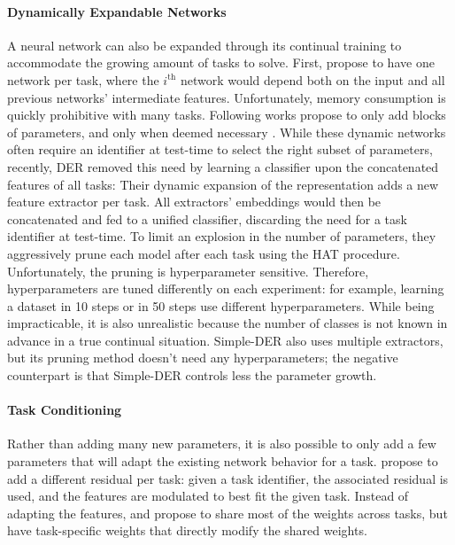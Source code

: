 \paragraph{Dynamically Expandable Networks} A neural network can also be expanded through its continual
training to accommodate the growing amount of tasks to solve. First, \citet{rusu2016progressive}
propose to have one network per task, where the $i^{\text{th}}$ network would depend both on the
input and all previous networks' intermediate features. Unfortunately, memory consumption is
quickly prohibitive with many tasks. Following works propose to only add blocks of parameters,
and only when deemed necessary \citep{veniat2021mntdp}. While these dynamic networks often require
an identifier at test-time to select the right subset of parameters, recently, DER
\citep{yan2021der} removed this need by learning a classifier upon the concatenated features of all tasks:
Their dynamic expansion of the representation adds a new feature extractor per task. All
extractors' embeddings would then be concatenated and fed to a unified classifier, discarding the
need for a task identifier at test-time. To limit an explosion in the number of parameters, they
aggressively prune each model after each task using the HAT \citep{serra2018hat} procedure.
Unfortunately, the pruning is hyperparameter sensitive. Therefore, hyperparameters are tuned
differently on each experiment: for example, learning a dataset in 10 steps or in 50 steps use
different hyperparameters. While being impracticable, it is also unrealistic because the number of
classes is not known in advance in a true continual situation. Simple-DER \citep{li2021preserve}
also uses multiple extractors, but its pruning method doesn't need any hyperparameters; the negative
counterpart is that Simple-DER controls less the parameter growth.

\paragraph{Task Conditioning} Rather than adding many new parameters, it is also possible to only
add a few parameters that will adapt the existing network behavior for a task.
\citet{rebuffi2017visualadapters} propose to add a different residual per task: given a task
identifier, the associated residual is used, and the features are modulated to best fit the given
task. Instead of adapting the features, \citet{wen2020batchensemble} and \citet{sun2019metatransfer}
propose to share most of the weights across tasks, but have task-specific weights that directly
modify the shared weights.

